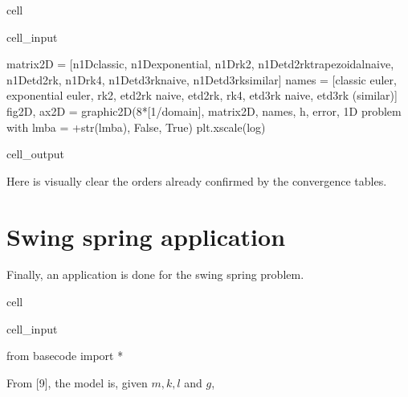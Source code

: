 \documentclass[letterpaper,10pt,english]{jupyterBook}
\begin{document}
\begin{sphinxuseclass}{cell}\begin{sphinxVerbatimInput}

\begin{sphinxuseclass}{cell_input}
\begin{sphinxVerbatim}[commandchars=\\\{\}]
matrix\PYGZus{}2D = [n\PYGZus{}1D\PYGZus{}classic, n\PYGZus{}1D\PYGZus{}exponential, n\PYGZus{}1D\PYGZus{}rk2, n\PYGZus{}1D\PYGZus{}etd2rk\PYGZus{}trapezoidal\PYGZus{}naive, n\PYGZus{}1D\PYGZus{}etd2rk, n\PYGZus{}1D\PYGZus{}rk4, n\PYGZus{}1D\PYGZus{}etd3rk\PYGZus{}naive, n\PYGZus{}1D\PYGZus{}etd3rk\PYGZus{}similar]
names = [\PYGZsq{}classic euler\PYGZsq{}, \PYGZsq{}exponential euler\PYGZsq{}, \PYGZsq{}rk2\PYGZsq{}, \PYGZsq{}etd2rk naive\PYGZsq{}, \PYGZsq{}etd2rk\PYGZsq{}, \PYGZsq{}rk4\PYGZsq{}, \PYGZsq{}etd3rk naive\PYGZsq{}, \PYGZdq{}etd3rk (similar)\PYGZdq{}]
fig\PYGZus{}2D, ax\PYGZus{}2D = graphic\PYGZus{}2D(8*[1/domain], matrix\PYGZus{}2D, names, \PYGZdq{}h\PYGZdq{}, \PYGZdq{}error\PYGZdq{}, \PYGZdq{}1D problem with lmba = \PYGZdq{}+str(lmba), False, True)
plt.xscale(\PYGZsq{}log\PYGZsq{})
\end{sphinxVerbatim}

\end{sphinxuseclass}\end{sphinxVerbatimInput}
\begin{sphinxVerbatimOutput}

\begin{sphinxuseclass}{cell_output}
\noindent{}

\end{sphinxuseclass}\end{sphinxVerbatimOutput}

\end{sphinxuseclass}
\sphinxAtStartPar
Here is visually clear the orders already confirmed by the convergence tables.

\sphinxstepscope


\section{Swing spring application}
\label{\detokenize{cap5:swing-spring-application}}\label{\detokenize{cap5::doc}}
\sphinxAtStartPar
Finally, an application is done for the swing spring problem.

\begin{sphinxuseclass}{cell}\begin{sphinxVerbatimInput}

\begin{sphinxuseclass}{cell_input}
\begin{sphinxVerbatim}[commandchars=\\\{\}]
from basecode import *
\end{sphinxVerbatim}

\end{sphinxuseclass}\end{sphinxVerbatimInput}

\end{sphinxuseclass}
\sphinxAtStartPar
From {[}9{]}, the model is, given \(m, k, l\) and \(g\),
\end{document}
